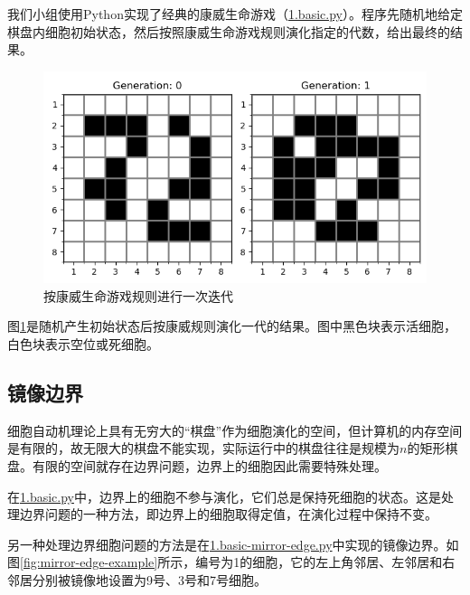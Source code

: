\documentclass{ctexart}
\begin{document}
我们小组使用Python实现了经典的康威生命游戏（\underline{1.basic.py}）。程序先随机地给定棋盘内细胞初始状态，然后按照康威生命游戏规则演化指定的代数，给出最终的结果。

\begin{figure}[ht]
  \centering
  \includegraphics[scale=0.75]{cellular-automation.png}
  \caption{按康威生命游戏规则进行一次迭代}
  \label{fig:cellular-automation}
\end{figure}

图\ref{fig:cellular-automation}是随机产生初始状态后按康威规则演化一代的结果。图中黑色块表示活细胞，白色块表示空位或死细胞。

\subsection{镜像边界}

细胞自动机理论上具有无穷大的“棋盘”作为细胞演化的空间，但计算机的内存空间是有限的，故无限大的棋盘不能实现，实际运行中的棋盘往往是规模为$n$的矩形棋盘。有限的空间就存在边界问题，边界上的细胞因此需要特殊处理。

在\underline{1.basic.py}中，边界上的细胞不参与演化，它们总是保持死细胞的状态。这是处理边界问题的一种方法，即边界上的细胞取得定值，在演化过程中保持不变。

另一种处理边界细胞问题的方法是在\underline{1.basic-mirror-edge.py}中实现的镜像边界。如图\ref{fig:mirror-edge-example}所示，编号为1的细胞，它的左上角邻居、左邻居和右邻居分别被镜像地设置为9号、3号和7号细胞。
\end{document}
